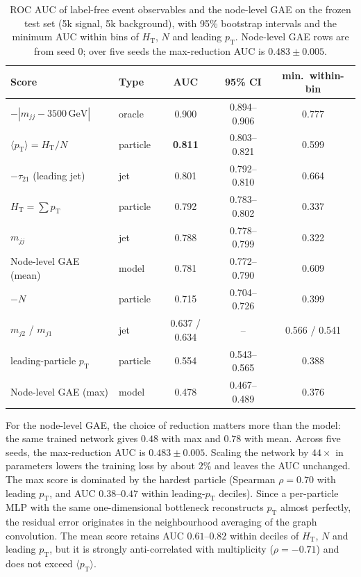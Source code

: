 \documentclass[11pt,a4paper]{article}
\newcommand{\pt}{\ensuremath{p_\mathrm{T}}\xspace}
\newcommand{\HT}{\ensuremath{H_\mathrm{T}}\xspace}
\newcommand{\mjj}{\ensuremath{m_{jj}}\xspace}
\newcommand{\tauTO}{\ensuremath{\tau_{21}}\xspace}
\newcommand{\ptmean}{\ensuremath{\langle \pt \rangle}\xspace}
\begin{document}
\begin{table}[t]
\centering
\caption{ROC AUC of label-free event observables and the node-level GAE on the frozen test set
(5k signal, 5k background), with 95\% bootstrap intervals and the minimum AUC within bins of \HT,
$N$ and leading \pt. Node-level GAE rows are from seed 0; over five seeds the max-reduction AUC is $0.483\pm0.005$.}
\label{tab:baselines}
\begin{tabular}{llccc}
\toprule
Score & Type & AUC & 95\% CI & min.\ within-bin \\
\midrule
$-|\mjj-3500\,\mathrm{GeV}|$ & oracle   & 0.900 & 0.894--0.906 & 0.777 \\
\ptmean $=\HT/N$             & particle & \textbf{0.811} & 0.803--0.821 & 0.599 \\
$-\tauTO$ (leading jet)      & jet      & 0.801 & 0.792--0.810 & 0.664 \\
\HT $=\sum\pt$               & particle & 0.792 & 0.783--0.802 & 0.337 \\
\mjj                         & jet      & 0.788 & 0.778--0.799 & 0.322 \\
Node-level GAE (mean)        & model    & 0.781 & 0.772--0.790 & 0.609 \\
$-N$                         & particle & 0.715 & 0.704--0.726 & 0.399 \\
$m_{j2}$ / $m_{j1}$          & jet      & 0.637 / 0.634 & -- & 0.566 / 0.541 \\
leading-particle \pt         & particle & 0.554 & 0.543--0.565 & 0.388 \\
Node-level GAE (max)         & model    & 0.478 & 0.467--0.489 & 0.376 \\
\bottomrule
\end{tabular}
\end{table}

For the node-level GAE, the choice of reduction matters more than the model: the same trained
network gives $0.48$ with max and $0.78$ with mean. Across five seeds, the max-reduction AUC is
$0.483\pm0.005$. Scaling the network by $44\times$ in parameters lowers the training loss by about
$2\%$ and leaves the AUC unchanged. The max score is dominated by the hardest particle
(Spearman $\rho=0.70$ with leading \pt, and AUC $0.38$--$0.47$ within leading-\pt deciles).
Since a per-particle MLP with the same one-dimensional bottleneck reconstructs \pt almost
perfectly, the residual error originates in the neighbourhood averaging of the graph convolution.
The mean score retains AUC $0.61$--$0.82$ within deciles of \HT, $N$ and leading \pt, but it is
strongly anti-correlated with multiplicity ($\rho=-0.71$) and does not exceed \ptmean.
\end{document}
